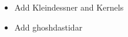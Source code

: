 \begin{itemize}


    \item %
        Add Kleindessner and Kernels
    \item %
        Add ghoshdastidar

\end{itemize}

